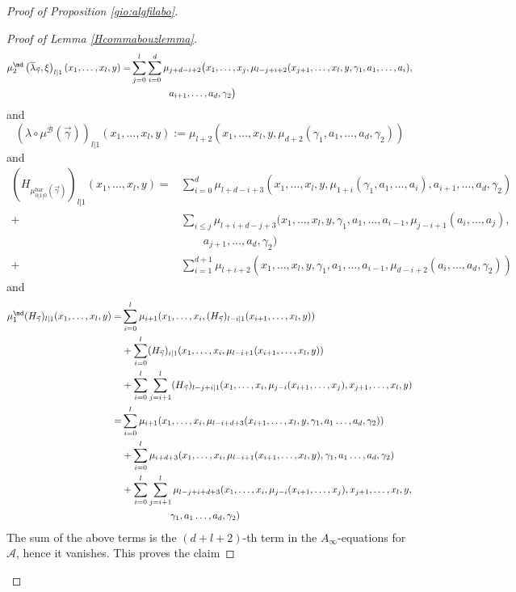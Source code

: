 \begin{proof}[Proof of Proposition \ref{gio:algfilabo}]
\begin{proof}[Proof of Lemma \ref{Hcommabouzlemma}]
$$\begin{aligned}
					\mu_2^\md\left(\overline{\lambda}_{\vec{\gamma}},\xi\right)_{l|1}(x_1,\ldots, x_l,y) = &\sum_{j=0}^l\sum_{i=0}^d \mu_{j+d-i+2}\bigl(x_1,\ldots, x_j,\mu_{l-j+i+2}(x_{j+1},\ldots, x_l,y, \gamma_1,a_1,\ldots, a_i),\\& \qquad \qquad  a_{i+1},\ldots, a_d, \gamma_2\bigr)
				\end{aligned}$$		
and $$\left(\lambda\circ\mu^{\overline{\mathcal{B}}}(\vec{\gamma})\right)_{l|1}(x_1,\ldots, x_l,y):= \mu_{l+2}(x_1,\ldots, x_l,y,\mu_{d+2}(\gamma_1,a_1,\ldots, a_d,\gamma_2))$$
and \begin{align*}\left(H_{\mu^\text{bar}_{0|1|0}(\vec{\gamma})}\right)_{l|1}(x_1,\ldots, x_l,y)= & \sum_{i=0}^d\mu_{l+d-i+3}(x_1,\ldots, x_l,y,\mu_{1+i}(\gamma_1,a_1,\ldots, a_i), a_{i+1}, \ldots, a_d, \gamma_2)\\ +& \sum_{i\leq j} \mu_{l+i+d-j+3}(x_1,\ldots, x_l,y,\gamma_1, a_1, \ldots , a_{i-1}, \mu_{j-i+1}(a_i,\ldots, a_j),\\ & \qquad a_{j+1}, \ldots, a_d, \gamma_2)\\ +&\sum_{i=1}^{d+1} \mu_{l+i+2}(x_1,\ldots, x_l,y,\gamma_1, a_1 , \ldots , a_{i-1},\mu_{d-i+2}(a_i,\dots, a_d,\gamma_2)) \end{align*}
and \begin{align*}\mu_1^{\md}(H_{\vec{\gamma}})_{l|1}(x_1,\ldots, x_l,y)=&\sum_{i=0}^l \mu_{i+1}(x_1,\ldots, x_{i},(H_{\vec{\gamma}})_{l-i|1}(x_{i+1},\ldots, x_l,y))\\
					 & +\sum_{i=0}^l(H_{\vec{\gamma}})_{i|1}(x_1,\ldots, x_i,\mu_{l-i+1}(x_{i+1},\ldots, x_l,y))\\ &+ 
					\sum_{i=0}^l\sum_{j=i+1}^l (H_{\vec{\gamma}})_{l-j+i|1}(x_1,\ldots,x_{i},\mu_{j-i}(x_{i+1},\ldots, x_j),x_{j+1},\ldots, x_l,y)\\
					=& \sum_{i=0}^l \mu_{i+1}(x_1,\ldots, x_{i},\mu_{l-i+d+3}(x_{i+1},\ldots, x_l,y, \gamma_1,a_1\ldots, a_d,\gamma_2))\\
					& +\sum_{i=0}^l\mu_{i+d+3}(x_1,\ldots, x_i,\mu_{l-i+1}(x_{i+1},\ldots, x_l,y), \gamma_1,a_1\ldots, a_d,\gamma_2)\\ &+ 
					\sum_{i=0}^l\sum_{j=i+1}^l \mu_{l-j+i+d+3}(x_1,\ldots,x_{i},\mu_{j-i}(x_{i+1},\ldots, x_j),x_{j+1},\ldots, x_l,y,\\ & \qquad \qquad \quad \gamma_1,a_1\ldots, a_d,\gamma_2)
				\end{align*}
The sum of the above terms is the $(d+l+2)$-th term in the $A_\infty$-equations for $\mathcal{A}$, hence it vanishes. This proves the claim
		\end{proof}
		

\end{proof}
